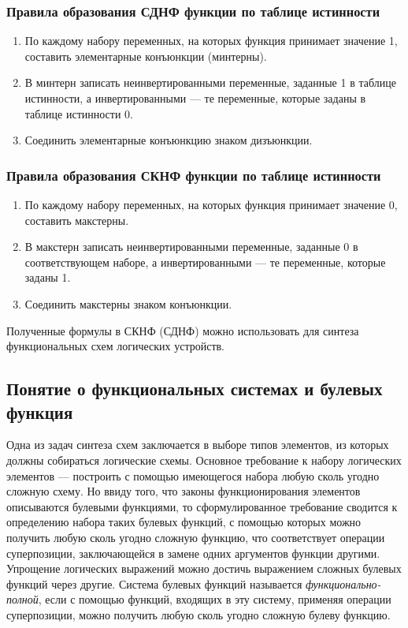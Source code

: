 \documentclass[10pt,a4paper,titlepage]{article}
\begin{document}
\subsubsection{Правила образования СДНФ функции по таблице истинности}

\begin{enumerate}
\item По каждому набору переменных, на которых функция принимает значение 1, составить элементарные конъюнкции (минтерны).
\item В минтерн записать неинвертированными переменные, заданные 1 в таблице истинности, а инвертированными --- те переменные, которые заданы в таблице истинности 0.
\item Соединить элементарные конъюнкцию знаком дизъюнкции.
\end{enumerate}

\subsubsection{Правила образования СКНФ функции по таблице истинности}
\begin{enumerate}
\item По каждому набору переменных, на которых функция принимает значение $0$, составить макстерны.
\item В макстерн записать неинвертированными переменные, заданные $0$ в соответствующем наборе, а инвертированными --- те переменные, которые заданы 1.
\item Соединить макстерны знаком конъюнкции.
\end{enumerate}

Полученные формулы в СКНФ (СДНФ) можно использовать для синтеза функциональных схем логических устройств.

\subsection{Понятие о функциональных системах и булевых функция}

Одна из задач синтеза схем заключается в выборе типов элементов, из которых должны собираться логические схемы.
Основное требование к набору логических элементов --- построить с помощью имеющегося набора любую сколь угодно сложную схему.
Но ввиду того, что законы функционирования элементов описываются булевыми функциями, то сформулированное требование сводится к определению набора таких булевых функций, с помощью которых можно получить любую сколь угодно сложную функцию, что соответствует операции суперпозиции, заключающейся в замене одних аргументов функции другими.
Упрощение логических выражений можно достичь выражением сложных булевых функций через другие.
Система булевых функций называется \textit{функционально-полной}, если с помощью функций, входящих в эту систему, применяя операции суперпозиции, можно получить любую сколь угодно сложную булеву функцию.
\end{document}
